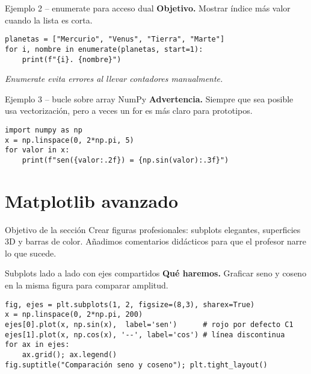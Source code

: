 \documentclass[10pt]{beamer}
\begin{document}
\begin{frame}[fragile]{Ejemplo 2 – enumerate para acceso dual}
\textbf{Objetivo.} Mostrar índice más valor cuando la lista es corta.
\begin{verbatim}
planetas = ["Mercurio", "Venus", "Tierra", "Marte"]
for i, nombre in enumerate(planetas, start=1):
    print(f"{i}. {nombre}")
\end{verbatim}
\emph{Enumerate evita errores al llevar contadores manualmente.}
\end{frame}

\begin{frame}[fragile]{Ejemplo 3 – bucle sobre array NumPy}
\textbf{Advertencia.} Siempre que sea posible usa vectorización,  
pero a veces un for es más claro para prototipos.
\begin{verbatim}
import numpy as np
x = np.linspace(0, 2*np.pi, 5)
for valor in x:
    print(f"sen({valor:.2f}) = {np.sin(valor):.3f}")
\end{verbatim}
\end{frame}

\section{Matplotlib avanzado}
\begin{frame}{Objetivo de la sección}
Crear figuras profesionales: subplots elegantes, superficies 3D y barras de color.  
Añadimos comentarios didácticos para que el profesor narre lo que sucede.
\end{frame}

\begin{frame}[fragile]{Subplots lado a lado con ejes compartidos}
\textbf{Qué haremos.} Graficar seno y coseno en la misma figura para comparar amplitud.
\begin{verbatim}
fig, ejes = plt.subplots(1, 2, figsize=(8,3), sharex=True)
x = np.linspace(0, 2*np.pi, 200)
ejes[0].plot(x, np.sin(x),  label='sen')      # rojo por defecto C1
ejes[1].plot(x, np.cos(x), '--', label='cos') # línea discontinua
for ax in ejes:
    ax.grid(); ax.legend()
fig.suptitle("Comparación seno y coseno"); plt.tight_layout()
\end{verbatim}
\end{frame}
\end{document}
